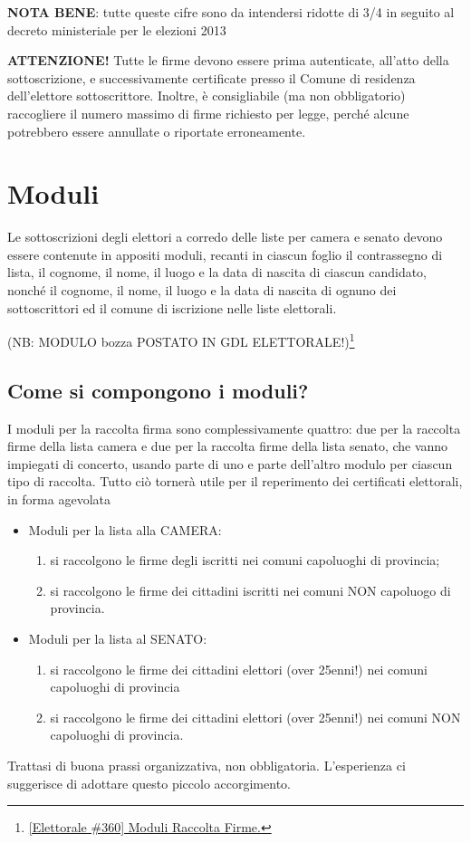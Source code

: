 \documentclass[paper=a4,11pt]{scrartcl}
\begin{document}
\textbf{NOTA BENE}: tutte queste cifre sono da intendersi ridotte di 3/4 in seguito al 
decreto ministeriale per le elezioni 2013

\begin{leftbar}\textbf{ATTENZIONE!} Tutte le firme devono essere prima autenticate, all'atto della 
sottoscrizione, e successivamente certificate presso il Comune di residenza 
dell'elettore sottoscrittore. Inoltre, è consigliabile (ma non obbligatorio) 
raccogliere il numero massimo di firme richiesto per legge, perché alcune 
potrebbero essere annullate o riportate erroneamente.\end{leftbar}

\section{Moduli}
Le sottoscrizioni degli elettori a corredo delle liste per camera e senato 
devono essere contenute in appositi moduli, recanti in ciascun foglio il 
contrassegno di lista, il cognome, il nome, il luogo e la data di nascita di 
ciascun candidato, nonché il cognome, il nome, il luogo e la data di nascita di 
ognuno dei sottoscrittori ed il comune di iscrizione nelle liste elettorali.

(NB: MODULO bozza POSTATO IN GDL ELETTORALE!)\footnote{\href{http://lists.partito-pirata.it/pipermail/elettorale/2012-December/000359.html}{[Elettorale \#360] Moduli Raccolta Firme.}}

\subsection{Come si compongono i moduli?}
I moduli per la raccolta firma sono complessivamente quattro: due per la 
raccolta firme della lista camera e due per la raccolta firme della lista 
senato, che vanno impiegati di concerto, usando parte di uno e parte dell'altro 
modulo per ciascun tipo di raccolta. Tutto ciò tornerà utile per il reperimento 
dei certificati elettorali, in forma agevolata
\begin{itemize}
\item Moduli per la lista alla CAMERA:
	\begin{enumerate}[1)]
	\item si raccolgono le firme degli iscritti nei comuni capoluoghi di provincia;
	\item si raccolgono le firme dei cittadini iscritti nei comuni NON capoluogo di 
	provincia.\end{enumerate}
\item Moduli per la lista al SENATO:
	\begin{enumerate}[1)]
	\item si raccolgono le firme dei cittadini elettori (over 25enni!) nei comuni 
	capoluoghi di provincia
	\item si raccolgono le firme dei cittadini elettori (over 25enni!) nei comuni NON 
	capoluoghi di provincia.\end{enumerate}
\end{itemize}
Trattasi di buona prassi organizzativa, non obbligatoria. L'esperienza ci 
suggerisce di adottare questo piccolo accorgimento.
\end{document}
